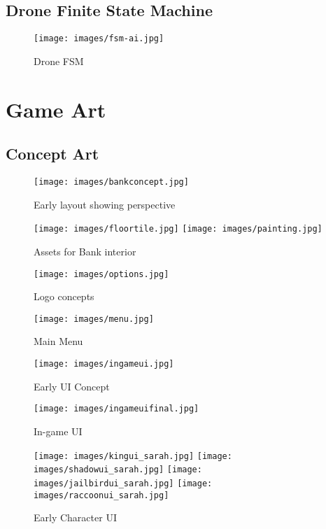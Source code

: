 \documentclass[10pt]{report}
\begin{document}
\section{Drone Finite State Machine}

\begin{figure}[h!]
	\texttt{[image: images/fsm-ai.jpg]}
	\caption{Drone FSM}
\end{figure}

\chapter{Game Art}

\section{Concept Art}

\begin{figure}[H]
	\texttt{[image: images/bankconcept.jpg]}
    \caption{Early layout showing perspective}
\end{figure}

\begin{figure}[H]
    \centering
    \texttt{[image: images/floortile.jpg]}
    \texttt{[image: images/painting.jpg]}
    \caption{Assets for Bank interior}
\end{figure}

\begin{figure}[H]
	\texttt{[image: images/options.jpg]}
    \caption{Logo concepts}
\end{figure}

\begin{figure}[H]
	\texttt{[image: images/menu.jpg]}
    \caption{Main Menu}
\end{figure}

\begin{figure}[H]
	\texttt{[image: images/ingameui.jpg]}
    \caption{Early UI Concept}
\end{figure}

\begin{figure}[H]
	\texttt{[image: images/ingameuifinal.jpg]}
    \caption{In-game UI}
\end{figure}

\begin{figure}[H]
    \centering
	\texttt{[image: images/kingui\_sarah.jpg]}
	\texttt{[image: images/shadowui\_sarah.jpg]}
	\texttt{[image: images/jailbirdui\_sarah.jpg]}
	\texttt{[image: images/raccoonui\_sarah.jpg]}
    \caption{Early Character UI}
\end{figure}
\end{document}
